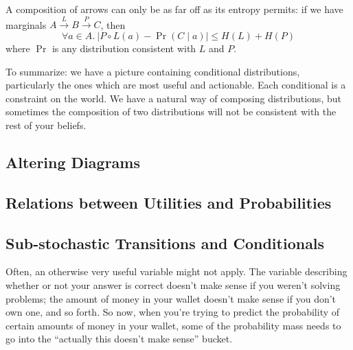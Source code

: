 \documentclass{article}
\begin{document}
	\begin{conj}
		A composition of arrows can only be as far off as its entropy permits: if we have marginals $A \xrightarrow{L} B \xrightarrow{P} C$, then
		\[ \forall a \in A.~ \Big|  P\circ L (a) - \Pr(C \mid a) \Big|  \leq H(L) + H(P) \]
		where $\Pr$ is any distribution consistent with $L$ and $P$.
	\end{conj}

	To summarize: we have a picture containing conditional distributions, particularly the ones which are most useful and actionable. Each conditional is a constraint on the world. We have a natural way of composing distributions, but sometimes the composition of two distributions will not be consistent with the rest of your beliefs.
		
	\subsection{Altering Diagrams} \label{sec:diagram-alterations}
	
	\subsection{Relations between Utilities and Probabilities} \label{sec:util-prob-relate}
	
	\subsection{Sub-stochastic Transitions and Conditionals} \label{sec:substochastic}
	
	Often, an otherwise very useful variable might not apply. The variable describing whether or not your answer is correct doesn't make sense if you weren't solving problems; the amount of money in your wallet doesn't make sense if you don't own one, and so forth. So now, when you're trying to predict the probability of certain amounts of money in your wallet, some of the probability mass needs to go into the ``actually this doesn't make sense'' bucket. 
	
\end{document}
